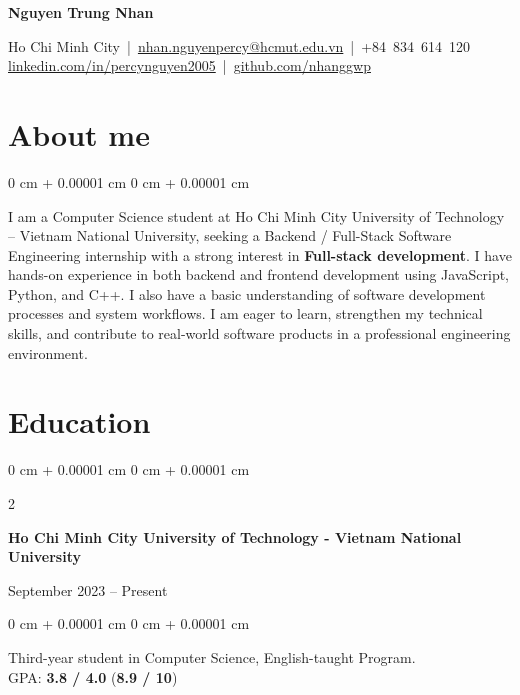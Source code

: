 \documentclass[10pt, letterpaper]{article}
\newenvironment{onecolentry}{
    \begin{adjustwidth}{
        0 cm + 0.00001 cm
    }{
        0 cm + 0.00001 cm
    }
}
{
    \end{adjustwidth}
}
\newenvironment{twocolentry}[2][]{
    \onecolentry
    \def\secondColumn{#2}
    \setcolumnwidth{\fill, 4.5 cm}
    \begin{paracol}{2}
}
{
    \switchcolumn \raggedleft \secondColumn
    \end{paracol}
    \endonecolentry
}
\newenvironment{header}{
    \setlength{\topsep}{0pt}\par\kern\topsep\centering\linespread{1.5}
}{
    \par\kern\topsep
}
\begin{document}
    \justifying
    \newcommand{\AND}{\unskip
        \cleaders\copy\ANDbox\hskip\wd\ANDbox
        \ignorespaces
    }
    \newsavebox\ANDbox
    \sbox\ANDbox{$|$}
    \begin{header}
    \centering
    {\fontsize{26pt}{26pt}\selectfont\bfseries Nguyen Trung Nhan}

    \vspace{6pt}

    \normalsize
    Ho Chi Minh City \,|\, 
    \href{mailto:nhan.nguyenpercy@hcmut.edu.vn}{nhan.nguyenpercy@hcmut.edu.vn} \,|\, 
    +84~834~614~120 \\[2pt]
    \href{https://www.linkedin.com/in/percynguyen2005/}{linkedin.com/in/percynguyen2005} \,|\, 
    \href{https://github.com/nhanggwp}{github.com/nhanggwp}
\end{header}

    \vspace{3 pt}

    \section{About me}
\begin{onecolentry}
I am a Computer Science student at Ho Chi Minh City University of Technology – Vietnam National University, seeking a Backend / Full-Stack Software Engineering internship with a strong interest in \textbf{Full-stack development}. I have hands-on experience in both backend and frontend development using JavaScript, Python, and C++. I also have a basic understanding of software development processes and system workflows. I am eager to learn, strengthen my technical skills, and contribute to real-world software products in a professional engineering environment.
\end{onecolentry}

   \section{Education}
\begin{twocolentry}{
    September 2023 – Present
}
    \textbf{Ho Chi Minh City University of Technology - Vietnam National University}
\end{twocolentry}

\begin{onecolentry}
    Third-year student in Computer Science, English-taught Program. \\
    GPA: \textbf{3.8 / 4.0} (\textbf{8.9 / 10})
\end{onecolentry}
\end{document}
